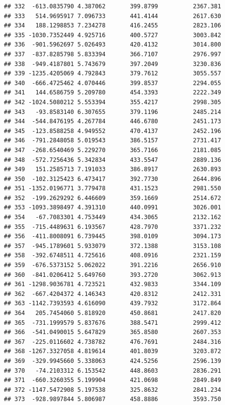 \documentclass[
]{article}
\begin{document}
\begin{verbatim}
## 332  -613.0835790 4.387062       399.8799          2367.381
## 333   514.9695917 7.096733       441.4144          2617.630
## 334   188.1298853 7.234278       416.2455          2823.106
## 335 -1030.7352449 4.925716       400.5727          3003.842
## 336  -901.5962697 5.026493       420.4132          3014.800
## 337  -837.8285798 5.833394       366.7107          2976.997
## 338  -949.4187801 5.743679       397.2049          3230.836
## 339 -1235.4205069 4.792843       379.7612          3055.557
## 340  -666.4725462 4.070446       399.8537          2294.055
## 341   144.6586759 5.209780       454.3393          2222.349
## 342 -1024.5080212 5.553394       355.4217          2998.305
## 343   -93.8583140 6.307655       379.1196          2485.214
## 344  -544.8476195 4.267784       446.6780          2451.173
## 345  -123.8588258 4.949552       470.4137          2452.196
## 346  -791.2848058 5.019543       386.5157          2731.417
## 347  -268.6540469 5.229270       365.7166          2181.085
## 348  -572.7256436 5.342834       433.5547          2889.136
## 349   151.2585713 7.191033       386.8917          2630.893
## 350  -102.3125423 6.473417       392.7730          2644.896
## 351 -1352.0196771 3.779478       431.1523          2981.550
## 352  -199.2629292 6.446609       359.1669          2514.672
## 353 -1093.3898497 4.391310       440.0991          3026.001
## 354   -67.7083301 4.753449       434.3065          2132.162
## 355  -715.4489631 6.193567       428.7970          3371.232
## 356  -411.8008091 6.739445       398.0109          3094.173
## 357  -945.1789601 5.933079       372.1388          3153.108
## 358  -392.6748511 4.725616       408.0916          2321.159
## 359  -676.5373152 5.062022       391.2216          2656.910
## 360  -841.0206412 5.649760       393.2720          3062.913
## 361 -1298.9036781 4.723521       432.9833          3344.109
## 362  -667.4204372 4.146343       420.8312          2412.331
## 363 -1142.7393593 4.616090       439.7932          3172.864
## 364   205.7454060 5.818920       450.8681          2417.820
## 365  -731.1999579 5.837676       388.5471          2999.412
## 366  -541.0490015 5.647829       365.8580          2607.353
## 367  -225.0116602 4.738782       476.7691          2484.316
## 368 -1267.3327058 4.819614       401.8039          3203.872
## 369  -329.9945660 5.338063       424.5256          2596.139
## 370   -74.2103312 6.153542       448.8603          2836.291
## 371  -660.3260355 5.199904       421.0698          2849.849
## 372 -1147.5472908 5.197538       325.8632          2841.234
## 373  -928.9897844 5.806987       458.8886          3593.750

\end{verbatim}
\end{document}
